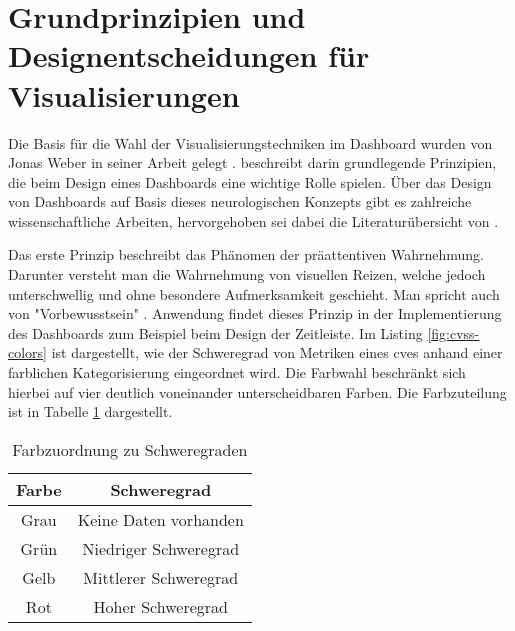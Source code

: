 \section{Grundprinzipien und Designentscheidungen für Visualisierungen}
\label{sec:auswahlDerVisualisierungstechniken}
Die Basis für die Wahl der Visualisierungstechniken im Dashboard wurden von Jonas Weber in seiner Arbeit gelegt \autocite{weberEvaluationDashboardTechniques}. \citeauthor{weberEvaluationDashboardTechniques} beschreibt darin grundlegende Prinzipien, die beim Design eines Dashboards eine wichtige Rolle spielen. Über das Design von Dashboards auf Basis dieses neurologischen Konzepts gibt es zahlreiche wissenschaftliche Arbeiten, hervorgehoben sei dabei die Literaturübersicht von \citeauthor{barrera-leonHowPreattentiveProcess2023} \autocite{barrera-leonHowPreattentiveProcess2023}. 
\par Das erste Prinzip beschreibt das Phänomen der präattentiven Wahrnehmung. Darunter versteht man die Wahrnehmung von visuellen Reizen, welche jedoch unterschwellig und ohne besondere Aufmerksamkeit geschieht. Man spricht auch von "Vorbewusstsein" \autocite{PraeattentiveWahrnehmung,mallotWahrnehmungPraeattentiveIm2021}. Anwendung findet dieses Prinzip in der Implementierung des Dashboards zum Beispiel beim Design der Zeitleiste. Im Listing \ref{fig:cvss-colors} ist dargestellt, wie der Schweregrad von Metriken eines \glspl{cve} anhand einer farblichen Kategorisierung eingeordnet wird. Die Farbwahl beschränkt sich hierbei auf vier deutlich voneinander unterscheidbaren Farben. Die Farbzuteilung ist in Tabelle \ref{tab:severity-color-mapping} dargestellt.
\begin{table}[H]
    \centering
    \caption{Farbzuordnung zu Schweregraden}
    \begin{tabular}{|c|c|}
        \hline
        \textbf{Farbe}                & \textbf{Schweregrad}  \\
        \hline
        \cellcolor[HTML]{6c757d} Grau & Keine Daten vorhanden \\
        \hline
        \cellcolor[HTML]{198754} Grün & Niedriger Schweregrad \\
        \hline
        \cellcolor[HTML]{ffc107} Gelb & Mittlerer Schweregrad \\
        \hline
        \cellcolor[HTML]{dc3545} Rot  & Hoher Schweregrad     \\
        \hline
    \end{tabular}
    \label{tab:severity-color-mapping}
\end{table}

